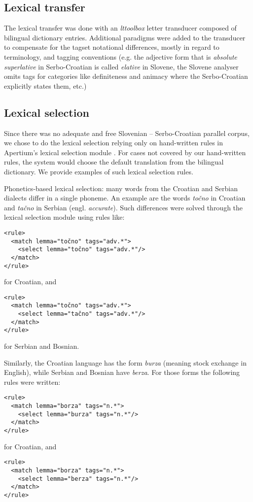 \subsection{Lexical transfer}
The lexical transfer was done with an \emph{lttoolbox} letter
transducer composed of bilingual dictionary entries. Additional
paradigms were added to the transducer to compensate for the tagset
notational differences, mostly in regard to terminology, and tagging
conventions (e.g. the adjective form that is \emph{absolute
  superlative} in Serbo-Croatian is called \emph{elative} in Slovene,
the Slovene analyser omits tags for categories like definiteness and
animacy where the Serbo-Croatian explicitly states them, etc.)

\subsection{Lexical selection}

Since there was no adequate and free Slovenian -- Serbo-Croatian parallel corpus, 
we chose to do the lexical selection relying only on hand-written rules in 
Apertium's lexical selection module \cite{tyers12a}.
For cases not covered by our hand-written rules, the system would choose the 
default translation from the bilingual dictionary.
We provide examples of such lexical selection rules.

Phonetics-based lexical selection: many words from the Croatian and Serbian dialects differ in a single phoneme.
An example are the words \emph{točno} in Croatian and \emph{tačno} in Serbian (engl. \emph{accurate}).
Such differences were solved through the lexical selection module using rules like:

{\small
\begin{Verbatim}
<rule>
  <match lemma="točno" tags="adv.*">
    <select lemma="točno" tags="adv.*"/>
  </match>
</rule>
\end{Verbatim}
}
for Croatian, and
{\small
\begin{Verbatim}
<rule>
  <match lemma="točno" tags="adv.*">
    <select lemma="tačno" tags="adv.*"/>
  </match>
</rule>
\end{Verbatim}
}
for Serbian and Bosnian.

Similarly, the Croatian language has the form \emph{burza} (meaning stock exchange in English), while Serbian and Bosnian have \emph{berza}. 
For those forms the following rules were written:

{\small
\begin{Verbatim}
<rule>
  <match lemma="borza" tags="n.*">
    <select lemma="burza" tags="n.*"/>
  </match>
</rule>
\end{Verbatim}
}
for Croatian, and 
{\small
\begin{Verbatim}
<rule>
  <match lemma="borza" tags="n.*">
    <select lemma="berza" tags="n.*"/>
  </match>
</rule>

\end{Verbatim}
}

